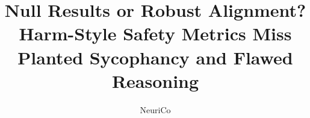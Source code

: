 \documentclass{article}
\title{Null Results or Robust Alignment? Harm-Style Safety Metrics Miss Planted Sycophancy and Flawed Reasoning}
\author{NeuriCo}
\begin{document}
\maketitle

\begin{abstract}

\end{abstract}











\appendix

\end{document}
